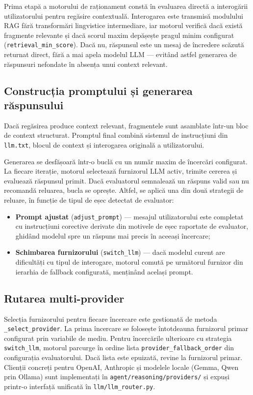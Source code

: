\documentclass[12pt, a4paper, oneside, romanian]{teza-upb}
\begin{document}
Prima etapă a motorului de raționament constă în evaluarea directă a interogării utilizatorului pentru regăsire contextuală. Interogarea este transmisă modulului RAG fără transformări lingvistice intermediare, iar motorul verifică dacă există fragmente relevante și dacă scorul maxim depășește pragul minim configurat (\texttt{retrieval\_min\_score}). Dacă nu, răspunsul este un mesaj de încredere scăzută returnat direct, fără a mai apela modelul LLM — evitând astfel generarea de răspunsuri nefondate în absența unui context relevant.

\subsection{Construcția promptului și generarea răspunsului}

Dacă regăsirea produce context relevant, fragmentele sunt asamblate într-un bloc de context structurat. Promptul final combină sistemul de instrucțiuni din \texttt{llm.txt}, blocul de context și interogarea originală a utilizatorului.

Generarea se desfășoară într-o buclă cu un număr maxim de încercări configurat. La fiecare iterație, motorul selectează furnizorul LLM activ, trimite cererea și evaluează răspunsul primit. Dacă evaluatorul semnalează un răspuns valid sau nu recomandă reluarea, bucla se oprește. Altfel, se aplică una din două strategii de reluare, în funcție de tipul de eșec detectat de evaluator:

\begin{itemize}
    \item \textbf{Prompt ajustat} (\texttt{adjust\_prompt}) — mesajul utilizatorului este completat cu instrucțiuni corective derivate din motivele de eșec raportate de evaluator, ghidând modelul spre un răspuns mai precis în aceeași încercare;
    \item \textbf{Schimbarea furnizorului} (\texttt{switch\_llm}) — dacă modelul curent are dificultăți cu tipul de interogare, motorul comută pe următorul furnizor din ierarhia de fallback configurată, menținând același prompt.
\end{itemize}

\subsection{Rutarea multi-provider}

Selecția furnizorului pentru fiecare încercare este gestionată de metoda \texttt{\_select\_provider}. La prima încercare se folosește întotdeauna furnizorul primar configurat prin variabile de mediu. Pentru încercările ulterioare cu strategia \texttt{switch\_llm}, motorul parcurge în ordine lista \texttt{provider\_fallback\_order} din configurația evaluatorului. Dacă lista este epuizată, revine la furnizorul primar. Clienții concreți pentru OpenAI, Anthropic și modelele locale (Gemma, Qwen prin Ollama) sunt implementați în \texttt{agent/reasoning/providers/} și expuși printr-o interfață unificată în \texttt{llm/llm\_router.py}.
\end{document}
